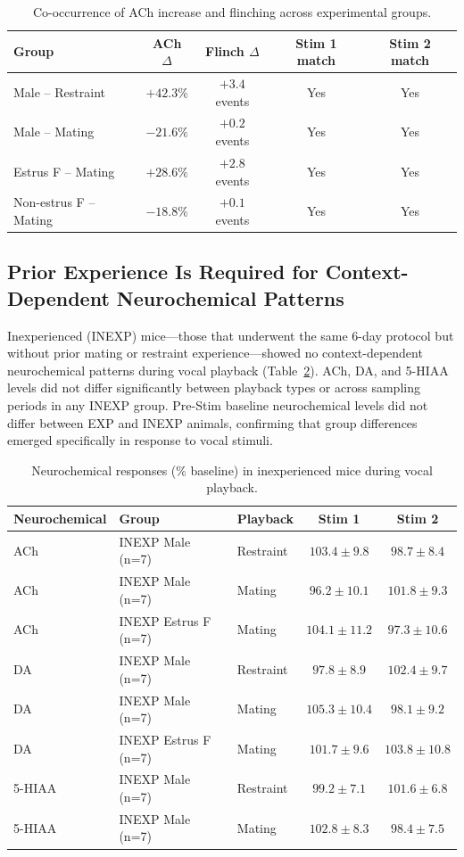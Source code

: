 \documentclass[11pt]{article}
\begin{document}
\begin{table}[H]
\centering
\caption{Co-occurrence of ACh increase and flinching across experimental groups.}
\label{tab:ach_flinch}
\begin{tabular}{lcccc}
\toprule
\textbf{Group} & \textbf{ACh $\Delta$} & \textbf{Flinch $\Delta$} & \textbf{Stim 1 match} & \textbf{Stim 2 match} \\
\midrule
Male -- Restraint & $+42.3\%$ & $+3.4$ events & Yes & Yes \\
Male -- Mating & $-21.6\%$ & $+0.2$ events & Yes & Yes \\
Estrus F -- Mating & $+28.6\%$ & $+2.8$ events & Yes & Yes \\
Non-estrus F -- Mating & $-18.8\%$ & $+0.1$ events & Yes & Yes \\
\bottomrule
\end{tabular}
\end{table}

\subsection{Prior Experience Is Required for Context-Dependent Neurochemical Patterns}

Inexperienced (INEXP) mice---those that underwent the same 6-day protocol but without prior mating or restraint experience---showed no context-dependent neurochemical patterns during vocal playback (Table~\ref{tab:inexp}). ACh, DA, and 5-HIAA levels did not differ significantly between playback types or across sampling periods in any INEXP group. Pre-Stim baseline neurochemical levels did not differ between EXP and INEXP animals, confirming that group differences emerged specifically in response to vocal stimuli.

\begin{table}[H]
\centering
\caption{Neurochemical responses (\% baseline) in inexperienced mice during vocal playback.}
\label{tab:inexp}
\begin{tabular}{lllcc}
\toprule
\textbf{Neurochemical} & \textbf{Group} & \textbf{Playback} & \textbf{Stim 1} & \textbf{Stim 2} \\
\midrule
ACh & INEXP Male (n=7) & Restraint & $103.4 \pm 9.8$ & $98.7 \pm 8.4$ \\
ACh & INEXP Male (n=7) & Mating & $96.2 \pm 10.1$ & $101.8 \pm 9.3$ \\
ACh & INEXP Estrus F (n=7) & Mating & $104.1 \pm 11.2$ & $97.3 \pm 10.6$ \\
DA & INEXP Male (n=7) & Restraint & $97.8 \pm 8.9$ & $102.4 \pm 9.7$ \\
DA & INEXP Male (n=7) & Mating & $105.3 \pm 10.4$ & $98.1 \pm 9.2$ \\
DA & INEXP Estrus F (n=7) & Mating & $101.7 \pm 9.6$ & $103.8 \pm 10.8$ \\
5-HIAA & INEXP Male (n=7) & Restraint & $99.2 \pm 7.1$ & $101.6 \pm 6.8$ \\
5-HIAA & INEXP Male (n=7) & Mating & $102.8 \pm 8.3$ & $98.4 \pm 7.5$ \\
\bottomrule
\end{tabular}
\end{table}
\end{document}
